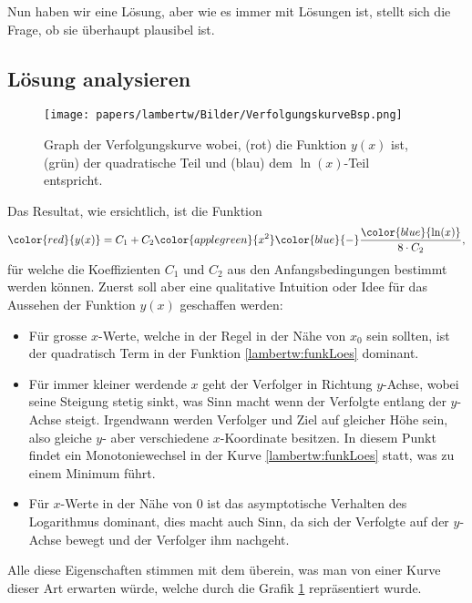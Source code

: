 Nun haben wir eine Lösung, aber wie es immer mit Lösungen ist, stellt sich die Frage, ob sie überhaupt plausibel ist.

\subsection{Lösung analysieren
	\label{lambertw:subsection:LoesAnalys}}


\begin{figure}
	\centering
	\texttt{[image: papers/lambertw/Bilder/VerfolgungskurveBsp.png]}
	\caption[Graph der Verfolgungskurve]{Graph der Verfolgungskurve wobei, ({\color{red}rot}) die Funktion \ensuremath{y(x)} ist, ({\color{applegreen}grün}) der quadratische Teil und ({\color{blue}blau}) dem \ensuremath{\operatorname{ln}(x)}-Teil entspricht.
		\label{lambertw:BildFunkLoes}
	}
\end{figure}

Das Resultat, wie ersichtlich, ist die Funktion  
\begin{equation}
	{\color{red}{y(x)}}
	=
	C_1 + C_2 {\color{applegreen}{x^2}} {\color{blue}{-}} \frac{\color{blue}{\operatorname{ln}(x)}}{8 \cdot C_2},
	\label{lambertw:funkLoes}
\end{equation}
für welche die Koeffizienten \(C_1\) und \(C_2\) aus den Anfangsbedingungen bestimmt werden können. Zuerst soll aber eine qualitative Intuition oder Idee für das Aussehen der Funktion \(y(x)\) geschaffen werden:
\begin{itemize}
	\item
	Für grosse \(x\)-Werte, welche in der Regel in der Nähe von \(x_0\) sein sollten, ist der quadratisch Term in der Funktion \eqref{lambertw:funkLoes} dominant. 
	\item
	Für immer kleiner werdende \(x\) geht der Verfolger in Richtung \(y\)-Achse, wobei seine Steigung stetig sinkt, was Sinn macht wenn der Verfolgte entlang der \(y\)-Achse steigt. Irgendwann werden Verfolger und Ziel auf gleicher Höhe sein, also gleiche \(y\)- aber verschiedene \(x\)-Koordinate besitzen.
	In diesem Punkt findet ein Monotoniewechsel in der Kurve \eqref{lambertw:funkLoes} statt, was zu einem Minimum führt.
	\item
	Für \(x\)-Werte in der Nähe von \(0\) ist das asymptotische Verhalten des Logarithmus dominant, dies macht auch Sinn, da sich der Verfolgte auf der \(y\)-Achse bewegt und der Verfolger ihm nachgeht.
\end{itemize}
Alle diese Eigenschaften stimmen mit dem überein, was man von einer Kurve dieser Art erwarten würde, welche durch die Grafik \ref{lambertw:BildFunkLoes} repräsentiert wurde.

